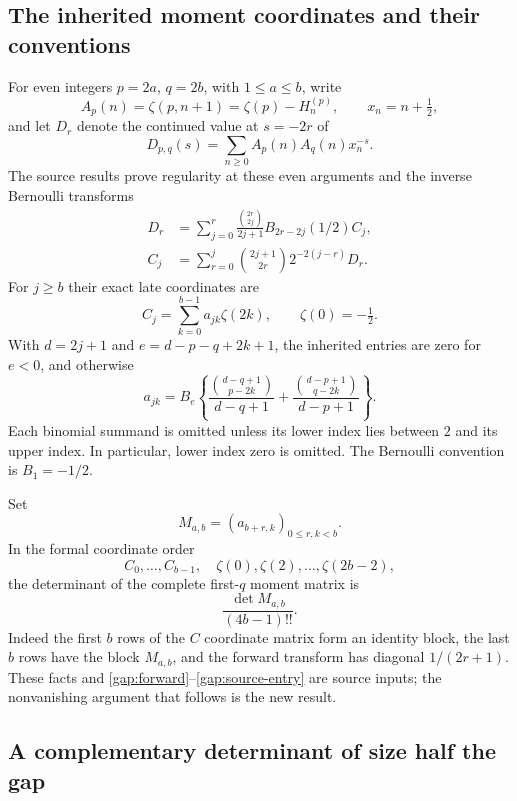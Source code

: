 \documentclass[11pt,letterpaper]{article}
\numberwithin{equation}{section}
\theoremstyle{plain}
\theoremstyle{definition}
\theoremstyle{remark}
\begin{document}
\subsection{The inherited moment coordinates and their conventions}

For even integers $p=2a$, $q=2b$, with $1\le a\le b$, write
\[
 A_p(n)=\zeta(p,n+1)=\zeta(p)-H_n^{(p)},\qquad x_n=n+\tfrac12,
\]
and let $D_r$ denote the continued value at $s=-2r$ of
\[
 D_{p,q}(s)=\sum_{n\ge0}A_p(n)A_q(n)x_n^{-s}.
\]
The source results prove regularity at these even arguments and the
inverse Bernoulli transforms
\begin{align}
 D_r&=\sum_{j=0}^r\frac{\binom{2r}{2j}}{2j+1}
 B_{2r-2j}(1/2)C_j,\label{gap:forward}\\
 C_j&=\sum_{r=0}^j\binom{2j+1}{2r}2^{-2(j-r)}D_r.
 \label{gap:inverse}
\end{align}
For $j\ge b$ their exact late coordinates are
\begin{equation}\label{gap:late-coordinates}
 C_j=\sum_{k=0}^{b-1}a_{jk}\zeta(2k),\qquad \zeta(0)=-\tfrac12.
\end{equation}
With $d=2j+1$ and $e=d-p-q+2k+1$, the inherited entries are zero
for $e<0$, and otherwise
\begin{equation}\label{gap:source-entry}
 a_{jk}=B_e\left\{
 \frac{\binom{d-q+1}{p-2k}}{d-q+1}
 +\frac{\binom{d-p+1}{q-2k}}{d-p+1}\right\}.
\end{equation}
Each binomial summand is omitted unless its lower index lies between
$2$ and its upper index. In particular, lower index zero is omitted.
The Bernoulli convention is $B_1=-1/2$.

Set
\begin{equation}\label{gap:late-matrix}
 M_{a,b}=(a_{b+r,k})_{0\le r,k<b}.
\end{equation}
In the formal coordinate order
\[
 C_0,\ldots,C_{b-1},\quad\zeta(0),\zeta(2),\ldots,\zeta(2b-2),
\]
the determinant of the complete first-$q$ moment matrix is
\begin{equation}\label{gap:full-prefix-determinant}
 \frac{\det M_{a,b}}{(4b-1)!!}.
\end{equation}
Indeed the first $b$ rows of the $C$ coordinate matrix form an
identity block, the last $b$ rows have the block $M_{a,b}$, and
the forward transform has diagonal $1/(2r+1)$. These facts and
\eqref{gap:forward}--\eqref{gap:source-entry} are source inputs;
the nonvanishing argument that follows is the new result.

\subsection{A complementary determinant of size half the gap}
\end{document}
